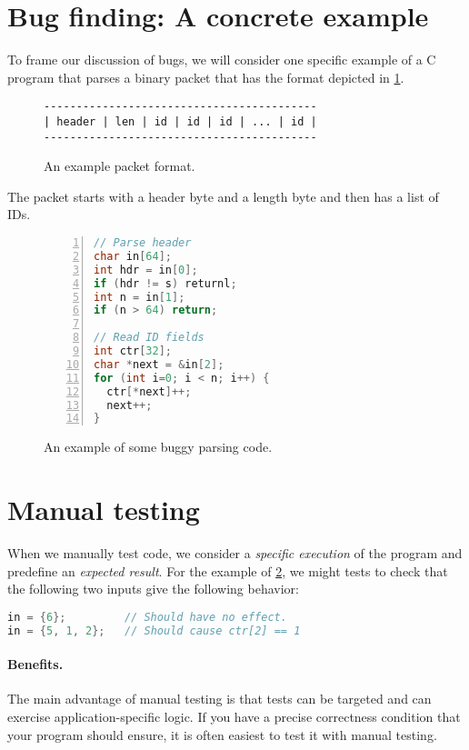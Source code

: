 \section{Bug finding: A concrete example}

To frame our discussion of bugs, we will consider one
specific example of a C program that parses a binary
packet that has the format depicted in \cref{fig:packet}.
\begin{figure}
\begin{verbatim}
------------------------------------------
| header | len | id | id | id | ... | id |
------------------------------------------
\end{verbatim}
\caption{An example packet format.}\label{fig:packet}
\end{figure}
The packet starts with a header byte and a length byte
and then has a list of IDs.

\begin{figure}
\begin{lstlisting}[language=c,numbers=left]
// Parse header
char in[64];
int hdr = in[0];
if (hdr != s) returnl;
int n = in[1];
if (n > 64) return;

// Read ID fields
int ctr[32];
char *next = &in[2];
for (int i=0; i < n; i++) {
  ctr[*next]++;
  next++;
}
\end{lstlisting}
\caption{An example of some buggy parsing code.}\label{fig:buggy}
\end{figure}


\section{Manual testing}

When we manually test code, we consider a \emph{specific execution} 
of the program and predefine an \emph{expected result}.
For the example of \cref{fig:buggy}, we might tests to check
that the following two inputs give the following behavior:
\begin{lstlisting}[language=c]
in = {6};         // Should have no effect.
in = {5, 1, 2};   // Should cause ctr[2] == 1
\end{lstlisting}

\paragraph{Benefits.}
The main advantage of manual testing is that
tests can be targeted and can exercise application-specific logic.
If you have a precise correctness condition that your program
should ensure, it is often easiest to test it with manual testing.

